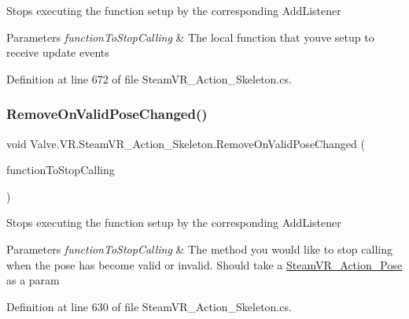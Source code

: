 Stops executing the function setup by the corresponding Add\+Listener 


\begin{DoxyParams}{Parameters}
{\em function\+To\+Stop\+Calling} & The local function that you\textquotesingle{}ve setup to receive update events\\
\hline
\end{DoxyParams}


Definition at line 672 of file Steam\+V\+R\+\_\+\+Action\+\_\+\+Skeleton.\+cs.

\mbox{\label{class_valve_1_1_v_r_1_1_steam_v_r___action___skeleton_a13f6b51dc671cd8dcf9b0063a7096ea9}} 
\subsubsection{\texorpdfstring{RemoveOnValidPoseChanged()}{RemoveOnValidPoseChanged()}}
{\footnotesize\ttfamily void Valve.\+V\+R.\+Steam\+V\+R\+\_\+\+Action\+\_\+\+Skeleton.\+Remove\+On\+Valid\+Pose\+Changed (\begin{DoxyParamCaption}\item[{\mbox{\hyperlink{class_valve_1_1_v_r_1_1_steam_v_r___action___skeleton_af5ad5e815b7f555aa33ee8b74385e89e}{Valid\+Pose\+Change\+Handler}}}]{function\+To\+Stop\+Calling }\end{DoxyParamCaption})}



Stops executing the function setup by the corresponding Add\+Listener 


\begin{DoxyParams}{Parameters}
{\em function\+To\+Stop\+Calling} & The method you would like to stop calling when the pose has become valid or invalid. Should take a \mbox{\hyperlink{class_valve_1_1_v_r_1_1_steam_v_r___action___pose}{Steam\+V\+R\+\_\+\+Action\+\_\+\+Pose}} as a param\\
\hline
\end{DoxyParams}


Definition at line 630 of file Steam\+V\+R\+\_\+\+Action\+\_\+\+Skeleton.\+cs.

\mbox{\label{class_valve_1_1_v_r_1_1_steam_v_r___action___skeleton_a41593a6cf089c0c458a710653db92bdc}} 
